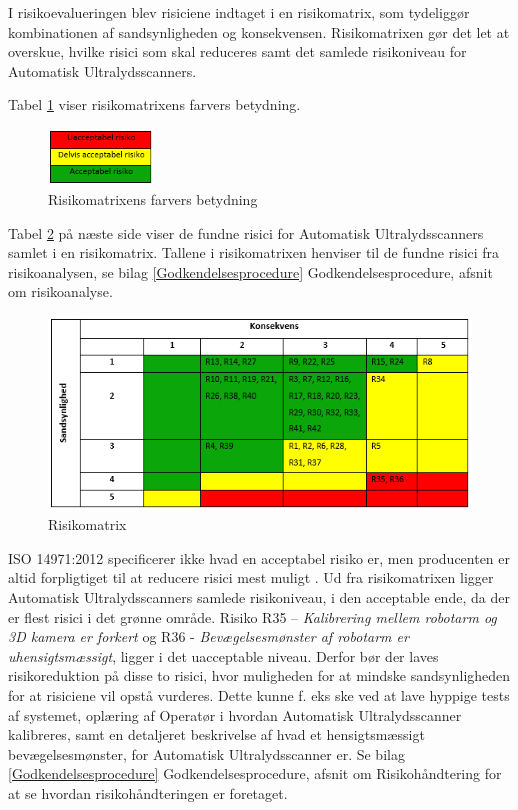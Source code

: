 I risikoevalueringen blev risiciene indtaget i en risikomatrix, som tydeliggør kombinationen af sandsynligheden og konsekvensen. Risikomatrixen gør det let at overskue, hvilke risici som skal reduceres samt det samlede risikoniveau for Automatisk Ultralydsscanners.  

Tabel \ref{Niveau} viser risikomatrixens farvers betydning. 

\begin{figure}[H]
    \centering
    \includegraphics[width=0.25\textwidth]{figurer/r/Niveau}
    \caption{Risikomatrixens farvers betydning}
    \label{Niveau}
\end{figure}

Tabel \ref{Risiko} på næste side viser de fundne risici for Automatisk Ultralydsscanners samlet i en risikomatrix. Tallene i risikomatrixen henviser til de fundne risici fra risikoanalysen, se bilag \ref{Godkendelsesprocedure} Godkendelsesprocedure, afsnit om risikoanalyse.  

\begin{figure}[H]
    \centering
    \includegraphics[width=1\textwidth]{figurer/r/Risiko}
    \caption{Risikomatrix}
    \label{Risiko}
\end{figure}

ISO 14971:2012 specificerer ikke hvad en acceptabel risiko er, men producenten er altid forpligtiget til at reducere risici mest muligt \cite{14971}. Ud fra risikomatrixen ligger Automatisk Ultralydsscanners samlede risikoniveau, i den acceptable ende, da der er flest risici i det grønne område. Risiko R35 – \textit{Kalibrering mellem robotarm og 3D kamera er forkert} og R36 - \textit{Bevægelsesmønster af robotarm er uhensigtsmæssigt}, ligger i det uacceptable niveau. Derfor bør der laves risikoreduktion på disse to risici, hvor muligheden for at mindske sandsynligheden for at risiciene vil opstå vurderes. Dette kunne f. eks ske ved at lave hyppige tests af systemet, oplæring af Operatør i hvordan Automatisk Ultralydsscanner kalibreres, samt en detaljeret beskrivelse af hvad et hensigtsmæssigt bevægelsesmønster, for Automatisk Ultralydsscanner er. Se bilag \ref{Godkendelsesprocedure} Godkendelsesprocedure, afsnit om Risikohåndtering for at se hvordan risikohåndteringen er foretaget. 

